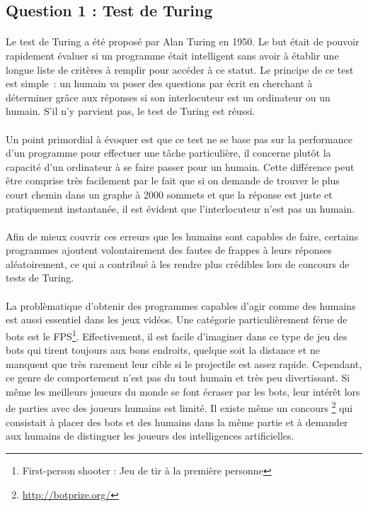 \subsection{Question 1 : Test de Turing}
\paragraph{}
Le test de Turing a été proposé par Alan Turing en 1950. Le but était de
pouvoir rapidement évaluer si un programme était intelligent sans avoir à
établir une longue liste de critères à remplir pour accéder à ce statut. Le
principe de ce test est simple~: un humain va poser des questions par écrit en
cherchant à déterminer grâce aux réponses si son interlocuteur est un ordinateur
ou un humain. S'il n'y parvient pas, le test de Turing est réussi.

\paragraph{}
Un point primordial à évoquer est que ce test ne se base pas sur la performance d'un
programme pour effectuer une tâche particulière, il concerne plutôt la capacité
d'un ordinateur à se faire passer pour un humain. Cette différence peut être
comprise très facilement par le fait que si on demande de trouver le plus
court chemin dans un graphe à 2000 sommets et que la réponse est juste et
pratiquement instantanée, il est évident que l'interlocuteur n'est pas un
humain.

\paragraph{}
Afin de mieux couvrir ces erreurs que les humains sont capables de faire,
certains programmes ajoutent volontairement des fautes de frappes à leurs
réponses aléatoirement, ce qui a contribué à les rendre plus crédibles lors de
concours de tests de Turing.

\paragraph{}
La problèmatique d'obtenir des programmes capables d'agir comme des humains est
aussi essentiel dans les jeux vidéos. Une catégorie particulièrement férue de
bots est le FPS\footnote{First-person shooter : Jeu de tir à la première
personne}. Effectivement, il est facile d'imaginer dans ce type de jeu des bots
qui tirent toujours aux bons endroits, quelque soit la distance et ne manquent
que très rarement leur cible si le projectile est assez rapide. Cependant, ce
genre de comportement n'est pas du tout humain et très peu divertissant. Si même
les meilleurs joueurs du monde se font écraser par les bots, leur intérêt lors
de parties avec des joueurs humains est limité. Il existe même un concours
\footnote{\url{http://botprize.org/}} qui consistait à placer des bots et des
humains dans la même partie et à demander aux humains de distinguer les joueurs
des intelligences artificielles.

